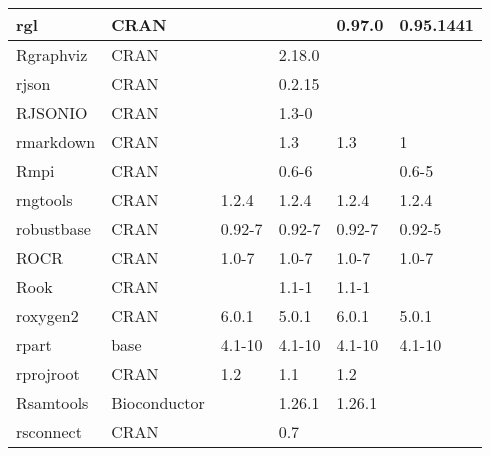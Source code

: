 \begin{longtable}{|llllll|}
rgl                           & CRAN                      &             &             & 0.97.0         & 0.95.1441        \\ \hline
Rgraphviz                     & CRAN                      &             & 2.18.0      &                &                   \\ \hline \rowcolor{gray!25}
rjson                         & CRAN                      &             & 0.2.15      &                &                  \\ \hline
RJSONIO                       & CRAN                      &             & 1.3-0       &                &                   \\ \hline \rowcolor{gray!25}
rmarkdown                     & CRAN                      &             & 1.3         & 1.3            & 1                \\ \hline
Rmpi                          & CRAN                      &             & 0.6-6       &                & 0.6-5             \\ \hline \rowcolor{gray!25}
rngtools                      & CRAN                      & 1.2.4       & 1.2.4       & 1.2.4          & 1.2.4            \\ \hline
robustbase                    & CRAN                      & 0.92-7      & 0.92-7      & 0.92-7         & 0.92-5            \\ \hline \rowcolor{gray!25}
ROCR                          & CRAN                      & 1.0-7       & 1.0-7       & 1.0-7          & 1.0-7            \\ \hline
Rook                          & CRAN                      &             & 1.1-1       & 1.1-1          &                   \\ \hline \rowcolor{gray!25}
roxygen2                      & CRAN                      & 6.0.1       & 5.0.1       & 6.0.1          & 5.0.1            \\ \hline
rpart                         & base                      & 4.1-10      & 4.1-10      & 4.1-10         & 4.1-10            \\ \hline \rowcolor{gray!25}
rprojroot                     & CRAN                      & 1.2         & 1.1         & 1.2            &                  \\ \hline
Rsamtools                     & Bioconductor              &             & 1.26.1      & 1.26.1         &                   \\ \hline \rowcolor{gray!25}
rsconnect                     & CRAN                      &             & 0.7         &                &                  \\ \hline

\end{longtable}
